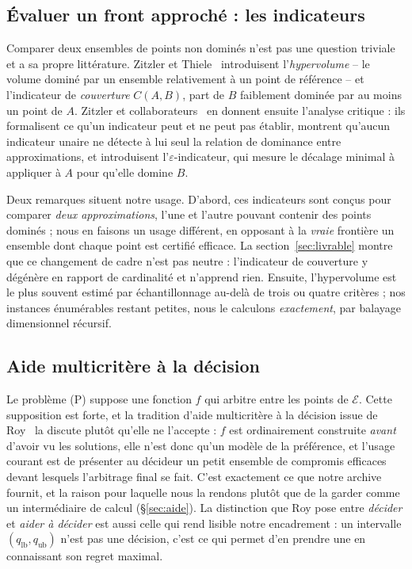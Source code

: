 \documentclass[11pt,a4paper]{article}
\theoremstyle{plain}
\theoremstyle{remark}
\newcommand{\Ecal}{\mathcal{E}}
\begin{document}
\subsection{Évaluer un front approché : les indicateurs}
\label{sec:revueind}

Comparer deux ensembles de points non dominés n'est pas une question triviale
et a sa propre littérature. Zitzler et Thiele~\cite{zitzler1999} introduisent
l'\emph{hypervolume} -- le volume dominé par un ensemble relativement à un
point de référence -- et l'indicateur de \emph{couverture} $C(A,B)$, part de
$B$ faiblement dominée par au moins un point de $A$. Zitzler et
collaborateurs~\cite{zitzler2003} en donnent ensuite l'analyse critique : ils
formalisent ce qu'un indicateur peut et ne peut pas établir, montrent
qu'aucun indicateur unaire ne détecte à lui seul la relation de dominance
entre approximations, et introduisent l'$\varepsilon$-indicateur, qui mesure
le décalage minimal à appliquer à $A$ pour qu'elle domine $B$.

Deux remarques situent notre usage. D'abord, ces indicateurs sont conçus
pour comparer \emph{deux approximations}, l'une et l'autre pouvant contenir
des points dominés ; nous en faisons un usage différent, en opposant à la
\emph{vraie} frontière un ensemble dont chaque point est certifié efficace.
La section~\ref{sec:livrable} montre que ce changement de cadre n'est pas
neutre : l'indicateur de couverture y dégénère en rapport de cardinalité et
n'apprend rien. Ensuite, l'hypervolume est le plus souvent estimé par
échantillonnage au-delà de trois ou quatre critères ; nos instances
énumérables restant petites, nous le calculons \emph{exactement}, par
balayage dimensionnel récursif.

\subsection{Aide multicritère à la décision}
\label{sec:revueaide}

Le problème (P) suppose une fonction $f$ qui arbitre entre les points de
$\Ecal$. Cette supposition est forte, et la tradition d'aide multicritère à
la décision issue de Roy~\cite{roy1985} la discute plutôt qu'elle ne
l'accepte : $f$ est ordinairement construite \emph{avant} d'avoir vu les
solutions, elle n'est donc qu'un modèle de la préférence, et l'usage courant
est de présenter au décideur un petit ensemble de compromis efficaces devant
lesquels l'arbitrage final se fait. C'est exactement ce que notre archive
fournit, et la raison pour laquelle nous la rendons plutôt que de la garder
comme un intermédiaire de calcul (\S\ref{sec:aide}). La distinction que Roy
pose entre \emph{décider} et \emph{aider à décider} est aussi celle qui rend
lisible notre encadrement : un intervalle $(q_{\text{lb}},q_{\text{ub}})$
n'est pas une décision, c'est ce qui permet d'en prendre une en connaissant
son regret maximal.
\end{document}

